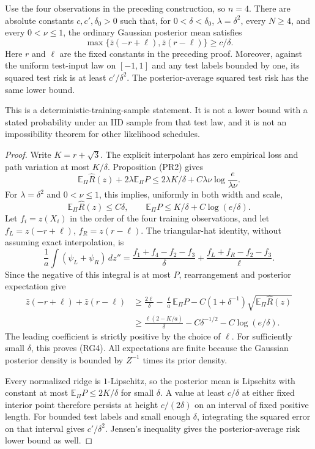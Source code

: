 \begin{corollary}
Use the four observations in the preceding construction, so $n=4$.
There are absolute constants $c,c',\delta_0>0$ such that, for
$0<\delta<\delta_0$, $\lambda=\delta^2$, every $N\ge4$, and every
$0<\nu\le1$, the ordinary Gaussian posterior mean satisfies
\[
 \max\{\bar z(-r+\ell),\bar z(r-\ell)\}\ge c/\delta. \tag{RG4}
\]
Here $r$ and $\ell$ are the fixed constants in the preceding proof.
Moreover, against the uniform test-input law on $[-1,1]$ and any test
labels bounded by one, its squared test risk is at least
$c'/\delta^2$. The posterior-average squared test risk has the same
lower bound.

This is a deterministic-training-sample statement. It is not a lower
bound with a stated probability under an IID sample from that test law,
and it is not an impossibility theorem for other likelihood schedules.
\end{corollary}
\begin{proof}
Write $K=r+\sqrt3$. The explicit interpolant has zero empirical loss
and path variation at most $K/\delta$. Proposition (PR2) gives
\[
 \mathbb E_\Pi\widehat R(z)+2\lambda\mathbb E_\Pi P
 \le2\lambda K/\delta+C\lambda\nu
             \log\frac e{\lambda\nu}.
\]
For $\lambda=\delta^2$ and $0<\nu\le1$, this implies, uniformly in
both width and scale,
\[
 \mathbb E_\Pi\widehat R(z)\le C\delta,
 \qquad
 \mathbb E_\Pi P\le K/\delta+C\log(e/\delta). \tag{RG5}
\]
Let $f_i=z(X_i)$ in the order of the four training observations, and
let $f_L=z(-r+\ell)$, $f_R=z(r-\ell)$. The triangular-hat identity,
without assuming exact interpolation, is
\[
 \frac1a\int(\psi_L+\psi_R)\,dz''
 =\frac{f_1+f_4-f_2-f_3}{\delta}
   +\frac{f_L+f_R-f_2-f_3}{\ell}.
\]
Since the negative of this integral is at most $P$, rearrangement
and posterior expectation give
\begin{align*}
 \bar z(-r+\ell)+\bar z(r-\ell)
 &\ge \frac{2\ell}{\delta}
       -\frac{\ell}{a}\mathbb E_\Pi P
       -C(1+\delta^{-1})
                       \sqrt{\mathbb E_\Pi\widehat R(z)}\\
 &\ge\frac{\ell(2-K/a)}{\delta}
       -C\delta^{-1/2}-C\log(e/\delta).
\end{align*}
The leading coefficient is strictly positive by the choice of
$\ell$. For sufficiently small $\delta$, this proves (RG4).
All expectations are finite because the Gaussian posterior density
is bounded by $Z^{-1}$ times its prior density.

Every normalized ridge is $1$-Lipschitz, so the posterior mean is
Lipschitz with constant at most $\mathbb E_\Pi P\le2K/\delta$
for small $\delta$. A value at least $c/\delta$ at either fixed
interior point therefore persists at height $c/(2\delta)$ on an
interval of fixed positive length. For bounded test labels and
small enough $\delta$, integrating the squared error on that interval
gives $c'/\delta^2$. Jensen's inequality gives the posterior-average
risk lower bound as well.
\end{proof}
